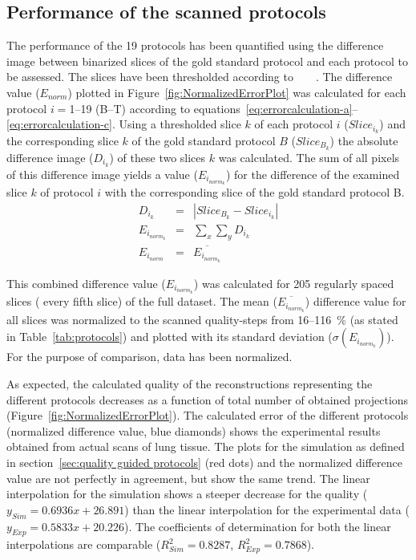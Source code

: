 \subsection{Performance of the scanned protocols}
The performance of the 19 protocols has been quantified using the difference image between binarized slices of the gold standard protocol and each protocol to be assessed. The slices have been thresholded according to%
\ifhtml%
	~\citet{Otsu1979}%
\else%
	~%
\fi%
. The difference value ($E_{norm}$) plotted in Figure~\ref{fig:NormalizedErrorPlot} was calculated for each protocol $i=$1--19 (B--T) according to equations~\ref{eq:errorcalculation-a}--\ref{eq:errorcalculation-c}. Using a thresholded slice $k$ of each protocol $i$ ($Slice_{i_{k}}$) and the corresponding slice $k$ of the gold standard protocol $B$ ($Slice_{B_{k}}$) the absolute difference image ($D_{i_{k}}$) of these two slices $k$ was calculated. The sum of all pixels of this difference image yields a value ($E_{i_{norm_{k}}}$) for the difference of the examined slice $k$ of protocol $i$ with the corresponding slice of the gold standard protocol B.
\begin{eqnarray}
	D_{i_{k}} &=& |Slice_{B_{k}}-Slice_{i_{k}}|\label{eq:errorcalculation-a}\\%
	E_{i_{norm_{k}}} &=& \sum_{x}\sum_{y} D_{i_{k}}\label{eq:errorcalculation-b}\\%
	E_{i_{norm}} &=& \overline{E_{i_{norm_{k}}}}\label{eq:errorcalculation-c}%
\end{eqnarray}

This combined difference value ($E_{i_{norm_{k}}}$) was calculated for 205 regularly spaced slices (%
every fifth slice) of the full dataset. The mean ($\overline{E_{i_{norm_{k}}}}$) difference value for all slices was normalized to the scanned quality-steps from 16--\SI{116}{\percent} (as stated in Table~\ref{tab:protocols}) and plotted with its standard deviation ($\sigma(E_{i_{norm_{k}}})$). For the purpose of comparison, data has been normalized.

As expected, the calculated quality of the reconstructions representing the different protocols decreases as a function of total number of obtained projections (Figure~\ref{fig:NormalizedErrorPlot}). The calculated error of the different protocols (normalized difference value, blue diamonds) shows the experimental results obtained from actual scans of lung tissue. The plots for the simulation as defined in section~\ref{sec:quality guided protocols} (red dots) and the normalized difference \cbstart value are not perfectly in agreement, but show the same trend. The linear interpolation for the simulation shows a steeper decrease for the quality ($y_{Sim}=0.6936x+26.891$) than the linear interpolation for the experimental data ($y_{Exp}=0.5833x+20.226$). The coefficients of determination for both the linear interpolations are comparable ($R^{2}_{Sim}=0.8287$, $R^{2}_{Exp}=0.7868$).

